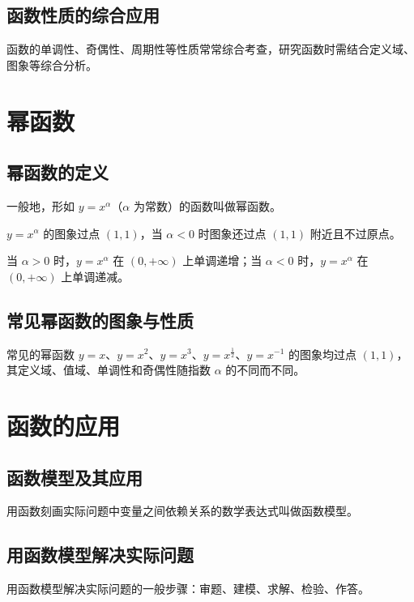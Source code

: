 \subsection{函数性质的综合应用}
\begin{definition}[函数性质的综合]
函数的单调性、奇偶性、周期性等性质常常综合考查，研究函数时需结合定义域、图象等综合分析。
\end{definition}

\section{幂函数}
\subsection{幂函数的定义}
\begin{definition}[幂函数]
一般地，形如 $y=x^\alpha$（$\alpha$ 为常数）的函数叫做幂函数。
\end{definition}
\begin{theorem}[幂函数过定点]
$y=x^\alpha$ 的图象过点 $(1,1)$，当 $\alpha<0$ 时图象还过点 $(1,1)$ 附近且不过原点。
\end{theorem}
\begin{corollary}[幂函数 $y=x^\alpha$ 在 $(0,+\infty)$ 上的单调性]
当 $\alpha>0$ 时，$y=x^\alpha$ 在 $(0,+\infty)$ 上单调递增；当 $\alpha<0$ 时，$y=x^\alpha$ 在 $(0,+\infty)$ 上单调递减。
\end{corollary}
\subsection{常见幂函数的图象与性质}
\begin{definition}[常见幂函数的性质]
常见的幂函数 $y=x$、$y=x^2$、$y=x^3$、$y=x^{\frac{1}{2}}$、$y=x^{-1}$ 的图象均过点 $(1,1)$，其定义域、值域、单调性和奇偶性随指数 $\alpha$ 的不同而不同。
\end{definition}

\section{函数的应用}
\subsection{函数模型及其应用}
\begin{definition}[函数模型]
用函数刻画实际问题中变量之间依赖关系的数学表达式叫做函数模型。
\end{definition}
\subsection{用函数模型解决实际问题}
\begin{definition}[用函数模型解题]
用函数模型解决实际问题的一般步骤：审题、建模、求解、检验、作答。
\end{definition}
